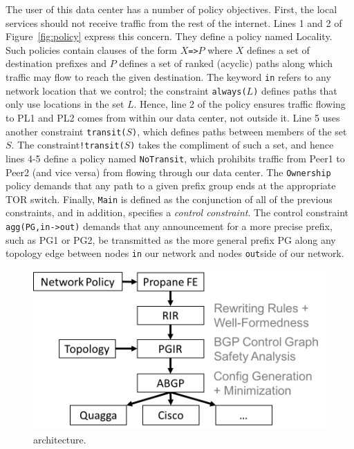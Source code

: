 The user of this data center has a number of policy objectives. First,
the local services should not receive traffic from the rest of the internet.  
Lines
1 and 2 of Figure~\ref{fig:policy} express this concern.  They define
a policy named Locality.  Such policies contain clauses of the form
\texttt{$X$=>$P$} where $X$ defines a set of destination prefixes and 
$P$ defines a set of ranked (acyclic) paths along which traffic may flow 
to reach the given destination.  The keyword \texttt{in} refers to
any network location that we control; the constraint \texttt{always($L$)}
defines paths that only use locations in the set $L$.  Hence, line 2
of the policy ensures traffic flowing to PL1 and PL2 comes from within
our data center, not outside it.  Line 5 uses another constraint
\texttt{transit($S$)}, which defines paths between members of the set $S$.
The constraint\texttt{!transit($S$)} takes the compliment of such a set,
and hence lines 4-5 define a policy named \texttt{NoTransit}, which prohibits
traffic from Peer1 to Peer2 (and vice versa) from flowing through our
data center.  The \texttt{Ownership} policy demands that any path
to a given prefix group ends at the appropriate TOR switch.  Finally,
\texttt{Main} is defined as the conjunction of all of the previous constraints,
and in addition, specifies a \emph{control constraint}.  The control
constraint \texttt{agg(PG,in->out)} demands that any announcement
for a more precise prefix, such as PG1 or PG2, be transmitted as the
more general prefix PG along any topology edge between nodes \texttt{in}
our network and nodes \texttt{out}side of our network.

%
\begin{figure}
  \centering
  \includegraphics[width=.45\textwidth]{figures/pipeline}
%
\caption{\Propane architecture.
}
  \label{fig:pipeline}
  \vspace{-1em}
\end{figure}
%
